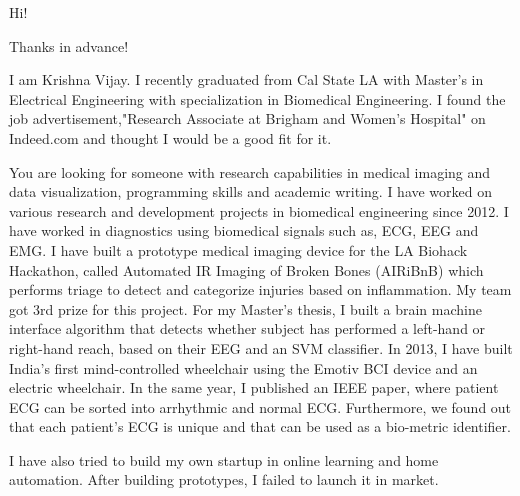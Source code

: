 \documentclass[11pt,a4paper,roman]{moderncv}
\begin{document}
\date{\today}
\opening{Hi!}
\closing{Thanks in advance!}
\makelettertitle


I am Krishna Vijay. I recently graduated from Cal State LA with Master's in Electrical Engineering with specialization in Biomedical Engineering. I found the job advertisement,"Research Associate at Brigham and Women's Hospital" on Indeed.com and thought I would be a good fit for it.


You are looking for someone with research capabilities in medical imaging and data visualization, programming skills and academic writing. I have worked on various research and development projects in biomedical engineering since 2012. I have worked in diagnostics using biomedical signals such as, ECG, EEG and EMG. I have built a prototype medical imaging device for the LA Biohack Hackathon, called Automated IR Imaging of Broken Bones (AIRiBnB) which performs triage to detect and categorize injuries based on inflammation. My team got 3rd prize for this project. 
For my Master's thesis, I built a brain machine interface algorithm that detects whether subject has performed a left-hand or right-hand reach, based on their EEG and an SVM classifier.
In 2013, I have built India's first mind-controlled wheelchair using the Emotiv BCI device and an electric wheelchair. In the same year, I published an IEEE paper, where patient ECG can be sorted into arrhythmic and normal ECG. Furthermore, we found out that each patient's ECG is unique and that can be used as a bio-metric identifier. 

I have also tried to build my own startup in online learning and home automation. After building prototypes, I failed to launch it in market.
\end{document}
